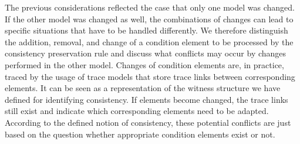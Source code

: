 The previous considerations reflected the case that only one model was changed.
If the other model was changed as well, the combinations of changes can lead to specific situations that have to be handled differently.
We therefore distinguish the addition, removal, and change of a condition element to be processed by the consistency preservation rule and discuss what conflicts may occur by changes performed in the other model.
Changes of condition elements are, in practice, traced by the usage of trace models that store trace links between corresponding elements.
It can be seen as a representation of the witness structure we have defined for identifying consistency.
If elements become changed, the trace links still exist and indicate which corresponding elements need to be adapted.
According to the defined notion of consistency, these potential conflicts are just based on the question whether appropriate condition elements exist or not.
